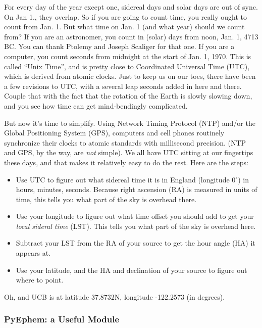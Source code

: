 \documentclass[11pt,preprint]{aastex}
\begin{document}
For every day of the year except one, sidereal days and solar days are out of sync.
On Jan 1., they overlap.  So if you are going to count time, you really ought
to count from Jan. 1.  But what time on Jan. 1 (and what year) should we count from?
If you are an astronomer, you count in (solar) days from noon, Jan. 1, 4713 BC.  You can thank
Ptolemy and Joseph Scaliger for that one.  If you are a computer, you count seconds from
midnight at the start of Jan. 1, 1970.  This is called ``Unix Time'', and is pretty close
to Coordinated Universal Time (UTC), which is derived from atomic clocks.  Just to keep us
on our toes, there have been
a few revisions to UTC, with a several leap seconds added in here and there.  Couple that
with the fact that the rotation of the Earth is slowly slowing down, and you see how time
can get mind-bendingly complicated.

But now it's time to simplify.  Using Network Timing Protocol (NTP) and/or the Global
Positioning System (GPS), computers and cell phones
routinely synchronize their clocks to atomic standards with millisecond precision.  (NTP and
GPS, by the way, are {\it not} simple).  We all
have UTC sitting at our fingertips these days, and that makes it relatively easy to do the rest.
Here are the steps:
\begin{itemize}
\item Use UTC to figure out what sidereal time it is in England (longitude 0$^\circ$) in hours, minutes,
seconds.  Because right
ascension (RA) is measured in units of time, this tells you what part of the sky is overhead there.
\item Use your longitude to figure out what time offset you should add to get your {\it local sideral time} (LST).
This tells you what part of the sky is overhead here.
\item Subtract your LST from the RA of your source to get the hour angle (HA) it appears at.
\item Use your latitude, and the HA and declination of your source to figure out where to point.
\end{itemize}

Oh, and UCB is at latitude 37.8732N, longitude -122.2573 (in degrees).

\subsubsection{PyEphem: a Useful Module}
\end{document}
